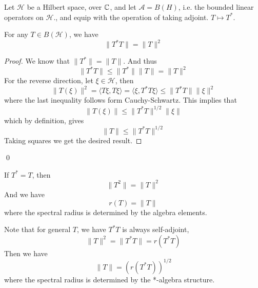 Let $\mathcal{H}$ be a Hilbert space, over $\mathbb{C}$, and let $\mathcal{A}=B(H)$, i.e. the bounded linear operators on $\mathcal{H}$., and equip with the operation of taking adjoint. $T\mapsto T^*$.

\begin{proposition}
    For any $T\in B(\mathcal{H})$, we have
    \begin{equation*}
        \|T^*T\|=\|T\|^2
    \end{equation*}
\end{proposition}
\begin{proof}
    We know that $\|T^*\|=\|T\|$. And thus
    \begin{equation*}
        \|T^*T\|\leq\|T^*\|\|T\|=\|T\|^2
    \end{equation*}
    For the reverse direction, let $\xi\in\mathcal{H}$, then
    \begin{equation*}
        \|T(\xi)\|^2=\langle T\xi, T\xi\rangle=\langle \xi, T^*T\xi\rangle\leq \|T^*T\|\|\xi\|^2
    \end{equation*} 
    where the last inequality follows form Cauchy-Schwartz. This implies that
    \begin{equation*}
        \|T(\xi)\|\leq \|T^*T\|^{1/2}\|\xi\|
    \end{equation*}
    which by definition, gives
    \begin{equation*}
        \|T\|\leq\|T^*T\|^{1/2}
    \end{equation*}
    Taking squares we get the desired result.
\end{proof}
\qed

\begin{corollary}
    If $T^*=T$, then
    \begin{equation*}
        \|T^2\|=\|T\|^2
    \end{equation*}
    And we have
    \begin{equation*}
        r(T)=\|T\|
    \end{equation*}
    where the spectral radius is determined by the algebra elements.
\end{corollary}

Note that for general $T$, we have  $T^*T$ is always self-adjoint,
\begin{equation*}
    \|T\|^2=\|T^*T\|=r(T^*T)
\end{equation*}
Then we have
\begin{equation*}
    \|T\|=(r(T^*T))^{1/2}
\end{equation*}
where the spectral radius is determined by the *-algebra structure.


